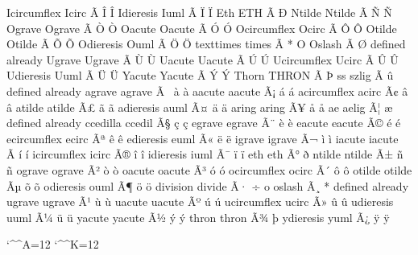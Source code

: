 \setucode Icircumflex Icirc ^^c3^^8e ^^ce {\^I}
\setucode Idieresis Iuml ^^c3^^8f ^^cf {\"I}
\setucode Eth ETH ^^c3^^90 ^^d0 {\uuchar{}}
\setucode Ntilde Ntilde ^^c3^^91 ^^d1 {\~N}
\setucode Ograve Ograve ^^c3^^92 ^^d2 {\`O}
\setcsucode Oacute Oacute ^^c3^^93 ^^d3 {\'O}
\setcsucode Ocircumflex Ocirc ^^c3^^94 ^^d4 {\^O}
\setucode Otilde Otilde ^^c3^^95 ^^d5 {\~O}
\setcsucode Odieresis Ouml ^^c3^^96 ^^d6 {\"O}
\setucode texttimes times ^^c3^^97 * {\intext{\times}}
\setucode O Oslash ^^c3^^98 ^^d8 {defined already}
\setucode Ugrave Ugrave ^^c3^^99 ^^d9 {\`U}
\setcsucode Uacute Uacute ^^c3^^9a ^^da {\'U}
\setucode Ucircumflex Ucirc ^^c3^^9b ^^db {\^U}
\setcsucode Udieresis Uuml ^^c3^^9c ^^dc {\"U}
\setcsucode Yacute Yacute ^^c3^^9d ^^dd {\'Y}
\setucode Thorn THRON ^^c3^^9e ^^de {\uuchar{}}
\setucode ss szlig ^^c3^^9f ^^fb {defined already}
\setucode agrave agrave ^^c3^^a0 ^^e0 {\`a}
\setcsucode aacute aacute ^^c3^^a1 ^^e1 {\'a}
\setucode acircumflex acirc ^^c3^^a2 ^^e2 {\^a}
\setucode atilde atilde ^^c3^^a3 ^^e3 {\~a}
\setcsucode adieresis auml ^^c3^^a4 ^^e4 {\"a}
\setucode aring aring ^^c3^^a5 ^^e5 {\r a}
\setucode ae aelig ^^c3^^a6 ^^e6 {defined already}
\setucode ccedilla ccedil ^^c3^^a7 ^^e7 {\c c}
\setucode egrave egrave ^^c3^^a8 ^^e8 {\`e}
\setcsucode eacute eacute ^^c3^^a9 ^^e9 {\'e}
\setucode ecircumflex ecirc ^^c3^^aa ^^ea {\^e}
\setucode edieresis euml ^^c3^^ab ^^eb {\"e}
\setucode igrave igrave ^^c3^^ac ^^ec {\`i}
\setcsucode iacute iacute ^^c3^^ad ^^ed {\'i}
\setucode icircumflex icirc ^^c3^^ae ^^ee {\^i}
\setucode idieresis iuml ^^c3^^af ^^ef {\"i}
\setucode eth eth ^^c3^^b0 ^^f0 {\uuchar{}}
\setucode ntilde ntilde ^^c3^^b1 ^^f1 {\~n}
\setucode ograve ograve ^^c3^^b2 ^^f2 {\`o}
\setcsucode oacute oacute ^^c3^^b3 ^^f3 {\'o}
\setcsucode ocircumflex ocirc ^^c3^^b4 ^^f4 {\^o}
\setucode otilde otilde ^^c3^^b5 ^^f5 {\~o}
\setcsucode odieresis ouml ^^c3^^b6 ^^f6 {\"o}
\setucode division divide ^^c3^^b7 ^^f7 {\intext{\div}}
\setucode o oslash ^^c3^^b8 * {defined already}
\setucode ugrave ugrave ^^c3^^b9 ^^f9 {\`u}
\setcsucode uacute uacute ^^c3^^ba ^^fa {\'u}
\setucode ucircumflex ucirc ^^c3^^bb ^^fb {\^u}
\setcsucode udieresis uuml ^^c3^^bc ^^fc {\"u}
\setcsucode yacute yacute ^^c3^^bd ^^fd {\'y}
\setucode thron thron ^^c3^^be ^^fe {\uuchar{}}
\setucode ydieresis yuml ^^c3^^bf ^^ff {\"y}

\catcode`\^^A=12 %
\catcode`\^^K=12 %

